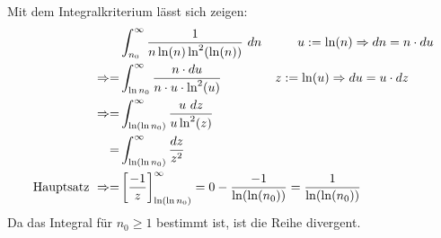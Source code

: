 \documentclass[10pt]{article}
\begin{document}
Mit dem Integralkriterium lässt sich zeigen:
\begin{align*}
	&\int_{n_0}^\infty \frac{1}{n \ln(n) \ln^2(\ln(n))} \ dn 
	\hspace{1cm}
	u := \ln(n) \Rightarrow dn = n \cdot du \\
	\Rightarrow 
	= &\int_{\ln n_0}^\infty \frac{n \cdot du}{n \cdot u \cdot 
	\ln^2(u)} 
	\hspace{1.5cm} z := \ln(u) \Rightarrow du = u \cdot dz \\
	\Rightarrow
	= &\int_{\ln(\ln n_0)}^\infty \frac{u \ dz}{u \ln^2(z)} \\
	= &\int_{\ln(\ln n_0)}^\infty \frac{dz}{z^2} \\
	\text{Hauptsatz } \Rightarrow =
	& \left[\frac{-1}{z} \right]_{\ln(\ln n_0)}^\infty 
	=
	0 - \frac{-1}{\ln(\ln(n_0))} = \frac{1}{\ln(\ln(n_0))}
\end{align*}
Da das Integral für $n_0 \geq 1$  bestimmt ist, ist die Reihe divergent.
\end{document}
